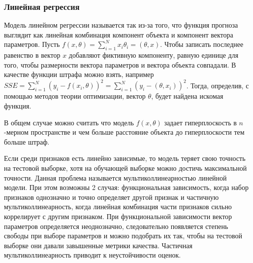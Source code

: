 \subsubsection{Линейная регрессия}

Модель линейном регрессии называется так из-за того, что функция прогноза выглядит как линейная комбинация компонент объекта и компонент вектора параметров. Пусть $f(x,\theta) = \sum\limits_{i=1}^N x_i \theta_i = (\theta, x)$. Чтобы записать последнее равенство в вектор $x$ добавляют фиктивную компоненту, равную единице для того, чтобы размерности вектора параметров и вектора объекта совпадали. В качестве функции штрафа можно взять, например $SSE = \sum\limits_{i=1}^N  (y_i - f(x_i,\theta))^2 = \sum\limits_{i=1}^N  (y_i - (\theta, x_i))^2$. Тогда, определив, с помощью методов теории оптимизации, вектор $\theta$, будет найдена искомая функция.

В общем случае можно считать что модель $f(x,\theta)$ задает гиперплоскость в $n$-мерном пространстве и чем больше расстояние объекта до гиперплоскости тем больше штраф.

Если среди признаков есть линейно зависимые, то модель теряет свою точность на тестовой выборке, хотя на обучающей выборке можно достичь максимальной точности. Данная проблема называется мультиколлинеарностью линейной модели. При этом возможны 2 случая: функциональная зависимость, когда набор признаков однозначно и точно определяет другой признак и частичную мультиколлинеарность, когда линейная комбинация части признаков сильно коррелирует с другим признаком. При функциональной зависимости вектор параметров определяется неоднозначно, следовательно появляется степень свободы при выборе параметров и можно подобрать их так, чтобы на тестовой выборке они давали завышенные метрики качества. Частичная мультиколлинеарность приводит к неустойчивости оценок.


